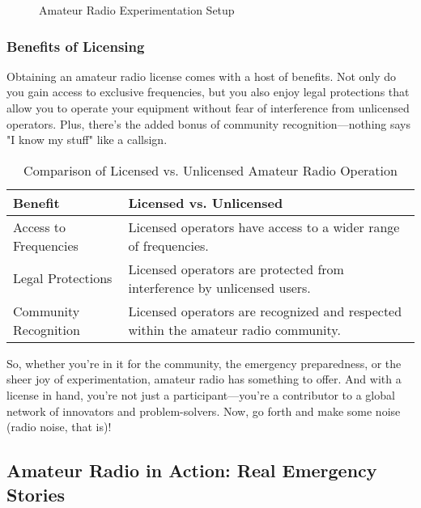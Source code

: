 \begin{figure}[h]
    \centering
    \caption{Amateur Radio Experimentation Setup}
    \label{fig:experimentation-setup}
\end{figure}

\subsubsection*{Benefits of Licensing}
Obtaining an amateur radio license comes with a host of benefits. Not only do you gain access to exclusive frequencies, but you also enjoy legal protections that allow you to operate your equipment without fear of interference from unlicensed operators. Plus, there's the added bonus of community recognition—nothing says "I know my stuff" like a callsign.

\begin{table}[h]
    \centering
    \begin{tabular}{|l|l|}
        \hline
        \textbf{Benefit} & \textbf{Licensed vs. Unlicensed} \\
        \hline
        Access to Frequencies & Licensed operators have access to a wider range of frequencies. \\
        Legal Protections & Licensed operators are protected from interference by unlicensed users. \\
        Community Recognition & Licensed operators are recognized and respected within the amateur radio community. \\
        \hline
    \end{tabular}
    \caption{Comparison of Licensed vs. Unlicensed Amateur Radio Operation}
    \label{tab:licensed-vs-unlicensed}
\end{table}

So, whether you're in it for the community, the emergency preparedness, or the sheer joy of experimentation, amateur radio has something to offer. And with a license in hand, you're not just a participant—you're a contributor to a global network of innovators and problem-solvers. Now, go forth and make some noise (radio noise, that is)!



\subsection{Amateur Radio in Action: Real Emergency Stories}
\label{subsec:emergency-stories}

